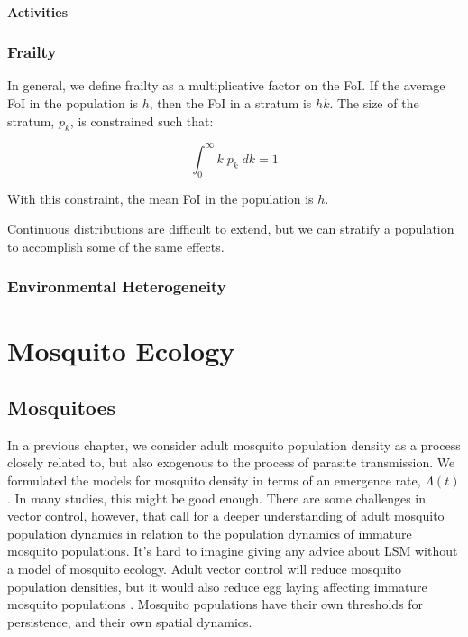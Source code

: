 \documentclass[
]{book}
\begin{document}
\subsection{Activities}\label{activities}

\section{Frailty}\label{frailtyCh}

In general, we define frailty as a multiplicative factor on the FoI. If the average FoI in the population is \(h\), then the FoI in a stratum is \(hk\). The size of the stratum, \(p_k\), is constrained such that:

\[\int_0^\infty k \; p_k \; dk = 1\]

With this constraint, the mean FoI in the population is \(h\).

Continuous distributions are difficult to extend, but we can stratify a population to accomplish some of the same effects.

\section{Environmental Heterogeneity}\label{environmentalHeterogeneity}

\part{Mosquito Ecology}\label{part-mosquito-ecology}

\chapter{Mosquitoes}\label{mosquitoes}

In a previous chapter, we consider adult mosquito population density as a process closely related to, but also exogenous to the process of parasite transmission. We formulated the models for mosquito density in terms of an emergence rate, \(\Lambda(t)\). In many studies, this might be good enough. There are some challenges in vector control, however, that call for a deeper understanding of adult mosquito population dynamics in relation to the population dynamics of immature mosquito populations. It's hard to imagine giving any advice about LSM without a model of mosquito ecology. Adult vector control will reduce mosquito population densities, but it would also reduce egg laying affecting immature mosquito populations \autocite{BradyOJ2015AdultVector}. Mosquito populations have their own thresholds for persistence, and their own spatial dynamics.
\end{document}
